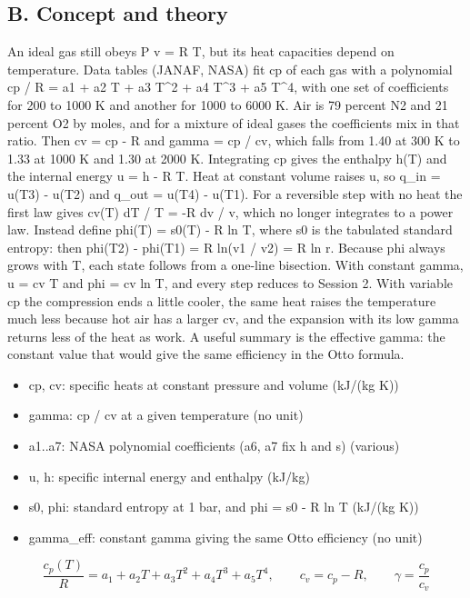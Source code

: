 \documentclass[11pt,a4paper]{article}
\begin{document}
\subsection*{B. Concept and theory}
An ideal gas still obeys P v = R T, but its heat capacities depend on temperature. Data tables (JANAF, NASA) fit cp of each gas with a polynomial cp / R = a1 + a2 T + a3 T\textasciicircum{}2 + a4 T\textasciicircum{}3 + a5 T\textasciicircum{}4, with one set of coefficients for 200 to 1000 K and another for 1000 to 6000 K. Air is 79 percent N2 and 21 percent O2 by moles, and for a mixture of ideal gases the coefficients mix in that ratio. Then cv = cp - R and gamma = cp / cv, which falls from 1.40 at 300 K to 1.33 at 1000 K and 1.30 at 2000 K. Integrating cp gives the enthalpy h(T) and the internal energy u = h - R T. Heat at constant volume raises u, so q\_in = u(T3) - u(T2) and q\_out = u(T4) - u(T1). For a reversible step with no heat the first law gives cv(T) dT / T = -R dv / v, which no longer integrates to a power law. Instead define phi(T) = s0(T) - R ln T, where s0 is the tabulated standard entropy: then phi(T2) - phi(T1) = R ln(v1 / v2) = R ln r. Because phi always grows with T, each state follows from a one-line bisection. With constant gamma, u = cv T and phi = cv ln T, and every step reduces to Session 2. With variable cp the compression ends a little cooler, the same heat raises the temperature much less because hot air has a larger cv, and the expansion with its low gamma returns less of the heat as work. A useful summary is the effective gamma: the constant value that would give the same efficiency in the Otto formula.

\begin{itemize}[nosep]
\item cp, cv: specific heats at constant pressure and volume (kJ/(kg K))
\item gamma: cp / cv at a given temperature (no unit)
\item a1..a7: NASA polynomial coefficients (a6, a7 fix h and s) (various)
\item u, h: specific internal energy and enthalpy (kJ/kg)
\item s0, phi: standard entropy at 1 bar, and phi = s0 - R ln T (kJ/(kg K))
\item gamma\_eff: constant gamma giving the same Otto efficiency (no unit)
\end{itemize}

\begin{equation*}
\frac{c_p(T)}{R} = a_1 + a_2 T + a_3 T^2 + a_4 T^3 + a_5 T^4,\qquad c_v = c_p - R,\qquad \gamma = \frac{c_p}{c_v}
\end{equation*}
\end{document}

